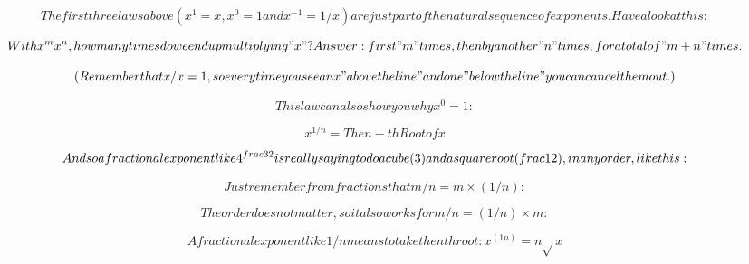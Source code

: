 \[The first three laws above (x^{1} = x, x^{0} = 1 and x^{-1} = 1/x) are just part of the natural sequence of exponents. Have a look at this:\]

\[With x^{m}x^{n}, how many times do we end up multiplying "x"? Answer: first "m" times, then by another "n" times, for a total of "m+n" times.\]

\[(Remember that x/x = 1, so every time you see an x "above the line" and one "below the line" you can cancel them out.)\]

\[This law can also show you why x^{0}=1 :\]

\[x^{1/n} = The n-th Root of x\]

\[And so a fractional exponent like 4^{\\frac{3}{2}} is really saying to do a cube (3) and a square root (\\frac{1}{2}), in any order, like this:\]

\[Just remember from fractions that m/n = m \times (1/n):\]

\[The order does not matter, so it also works for m/n = (1/n) \times m:\]

\[A fractional exponent like 1/n means to take the nth root: x^{(1n)} = n\sqrt{}x\]
